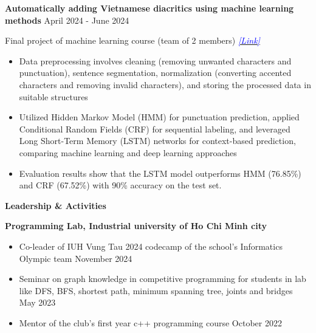 \documentclass[11pt]{article}
\begin{document}
    \vspace{12pt}
    
    \textbf{Automatically adding Vietnamese diacritics using machine learning methods} \hfill April 2024 - June 2024
    
    Final project of machine learning course (team of 2 members) 
    \hfill 
    \href{https://drive.google.com/drive/folders/1MYifWSbVtX5ne9RHmLIcygAydHVeQGt2?usp=sharing}{\textcolor{blue}{\textit{[Link]}}}
    \begin{itemize}[noitemsep, topsep=0pt, partopsep=0pt, parsep=0pt]
        \item Data preprocessing involves cleaning (removing unwanted characters and punctuation), sentence segmentation, normalization (converting accented characters and removing invalid characters), and storing the processed data in suitable structures
        \item Utilized Hidden Markov Model (HMM) for punctuation prediction, applied Conditional Random Fields (CRF) for sequential labeling, and leveraged Long Short-Term Memory (LSTM) networks for context-based prediction, comparing machine learning and deep learning approaches 
        \item Evaluation results show that the LSTM model outperforms HMM (76.85\%) and CRF (67.52\%) with 90\% accuracy on the test set. 
    \end{itemize}







    \begin{center}
        \hrulefill
    \end{center}
    \begin{center}
        \textbf{Leadership \& Activities}
    \end{center}
    
    \textbf{Programming Lab, Industrial university of Ho Chi Minh city} 
    \begin{itemize}[noitemsep, topsep=0pt, partopsep=0pt, parsep=0pt]
        \item Co-leader of IUH Vung Tau 2024 codecamp of the school's Informatics Olympic team \hfill November 2024 
        \item Seminar on graph knowledge in competitive programming for students in lab like DFS, BFS, shortest path, minimum spanning tree, joints and bridges \hfill May 2023
        \item Mentor of the club's first year c++ programming course \hfill October 2022
    \end{itemize}
\end{document}
